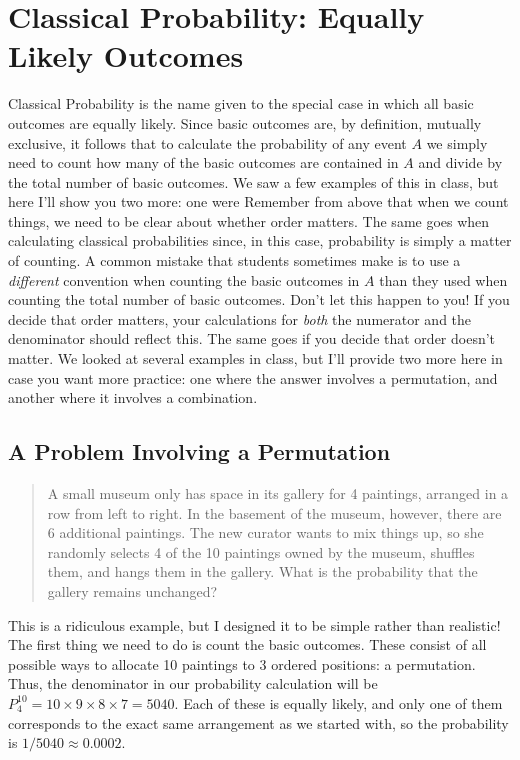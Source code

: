 \documentclass[12pt]{article}
\begin{document}
\section*{Classical Probability: Equally Likely Outcomes}
Classical Probability is the name given to the special case in which all basic outcomes are equally likely.
Since basic outcomes are, by definition, mutually exclusive, it follows that to calculate the probability of any event $A$ we simply need to count how many of the basic outcomes are contained in $A$ and divide by the total number of basic outcomes.
We saw a few examples of this in class, but here I'll show you two more: one were
Remember from above that when we count things, we need to be clear about whether order matters.
The same goes when calculating classical probabilities since, in this case, probability is simply a matter of counting.
A common mistake that students sometimes make is to use a \emph{different} convention when counting the basic outcomes in $A$ than they used when counting the total number of basic outcomes.
Don't let this happen to you!
If you decide that order matters, your calculations for \emph{both} the numerator and the denominator should reflect this.
The same goes if you decide that order doesn't matter.
We looked at several examples in class, but I'll provide two more here in case you want more practice: one where the answer involves a permutation, and another where it involves a combination.

\subsection*{A Problem Involving a Permutation}
\begin{quote}
  A small museum only has space in its gallery for 4 paintings, arranged in a row from left to right.
  In the basement of the museum, however, there are 6 additional paintings.
  The new curator wants to mix things up, so she randomly selects 4 of the 10 paintings owned by the museum, shuffles them, and hangs them in the gallery.
  What is the probability that the gallery remains unchanged?
\end{quote}
This is a ridiculous example, but I designed it to be simple rather than realistic!
The first thing we need to do is count the basic outcomes.
These consist of all possible ways to allocate 10 paintings to 3 ordered positions: a permutation.
Thus, the denominator in our probability calculation will be $P^{10}_{4}=10\times 9 \times 8 \times 7 =5040$.
Each of these is equally likely, and only one of them corresponds to the exact same arrangement as we started with, so the probability is $1/5040 \approx 0.0002$.
\end{document}
